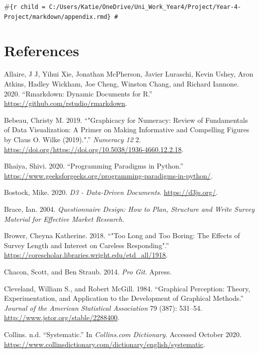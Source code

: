 \documentclass[
  11pt,
]{book}
\begin{document}
\#\texttt{\{r\ child\ =\ \textquotesingle{}C:/Users/Katie/OneDrive/Uni\_Work\_Year4/Project/Year-4-Project/markdown/appendix.rmd\textquotesingle{}\}\ \#}

\chapter{References}

\hypertarget{refs}{}
\leavevmode\hypertarget{ref-Allaire2020-sr}{}%
Allaire, J J, Yihui Xie, Jonathan McPherson, Javier Luraschi, Kevin
Ushey, Aron Atkins, Hadley Wickham, Joe Cheng, Winston Chang, and
Richard Iannone. 2020. ``Rmarkdown: Dynamic Documents for R.''
\url{https://github.com/rstudio/rmarkdown}.

\leavevmode\hypertarget{ref-wilkerev}{}%
Bebeau, Christy M. 2019. ``"Graphicacy for Numeracy: Review of
Fundamentals of Data Visualization: A Primer on Making Informative and
Compelling Figures by Claus O. Wilke (2019).".'' \emph{Numeracy 12} 2.
\url{https://doi.org/https://doi.org/10.5038/1936-4660.12.2.18}.

\leavevmode\hypertarget{ref-paradigm}{}%
Bhaiya, Shivi. 2020. ``Programming Paradigms in Python.''
\url{https://www.geeksforgeeks.org/programming-paradigms-in-python/}.

\leavevmode\hypertarget{ref-d3}{}%
Bostock, Mike. 2020. \emph{D3 - Data-Driven Documents}.
\url{https://d3js.org/}.

\leavevmode\hypertarget{ref-brace2004}{}%
Brace, Ian. 2004. \emph{Questionnaire Design: How to Plan, Structure and
Write Survey Material for Effective Market Research}.

\leavevmode\hypertarget{ref-brower}{}%
Brower, Cheyna Katherine. 2018. ``"Too Long and Too Boring: The Effects
of Survey Length and Interest on Careless Responding".''
\href{https://corescholar.libraries.wright.edu/etd_all/1918\%20}{https://corescholar.libraries.wright.edu/etd\_all/1918}.

\leavevmode\hypertarget{ref-git}{}%
Chacon, Scott, and Ben Straub. 2014. \emph{Pro Git}. Apress.

\leavevmode\hypertarget{ref-clevelandmcgill}{}%
Cleveland, William S., and Robert McGill. 1984. ``Graphical Perception:
Theory, Experimentation, and Application to the Development of Graphical
Methods.'' \emph{Journal of the American Statistical Association} 79
(387): 531--54. \url{http://www.jstor.org/stable/2288400}.

\leavevmode\hypertarget{ref-collins-systematic}{}%
Collins. n.d. ``Systematic.'' In \emph{Collins.com Dictionary}. Accessed
October 2020.
\url{https://www.collinsdictionary.com/dictionary/english/systematic}.
\end{document}
